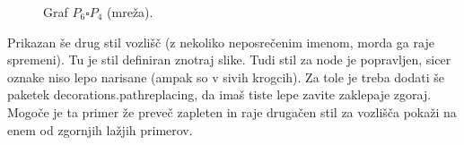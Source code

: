 \documentclass[a4paper,oneside,12pt]{article}
\begin{document}
\begin{figure}[!ht]
	\begin{center}
		\caption{Graf $P_6 \square P_4$ (mreža).}
		\label{grafmreza}
	\end{center}
\end{figure}

Prikazan še drug stil vozlišč (z nekoliko neposrečenim imenom, morda ga raje spremeni). Tu je stil definiran znotraj slike. Tudi stil za node je popravljen, sicer oznake niso lepo narisane (ampak so v sivih krogcih). Za tole je treba dodati še paketek decorations.pathreplacing, da imaš tiste lepe zavite zaklepaje zgoraj. Mogoče je ta primer že preveč zapleten in raje drugačen stil za vozlišča pokaži na enem od zgornjih lažjih primerov.
\end{document}
